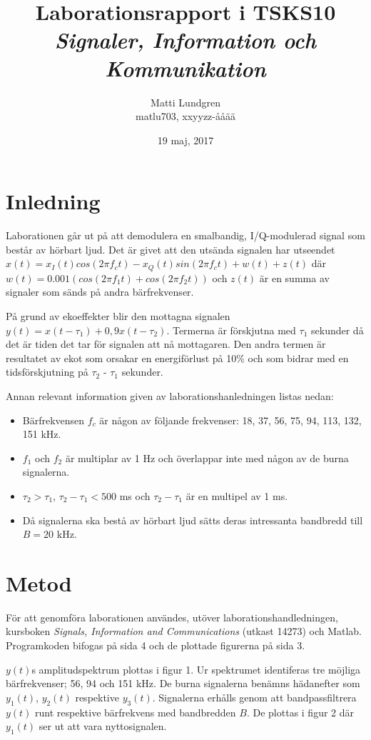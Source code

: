 \documentclass[10pt,twocolumn]{article}
\title{Laborationsrapport i TSKS10 \emph{Signaler, Information och Kommunikation}}
\author{Matti Lundgren \\ matlu703, xxyyzz-ååää }
\date{19 maj, 2017}
\begin{document}
\maketitle

\clearpage

\section{Inledning}

Laborationen går ut på att demodulera en smalbandig, I/Q-modulerad signal som består av hörbart ljud. Det är givet att den utsända signalen har utseendet $x(t)=x_I(t)cos(2\pi f_ct)-x_Q(t)sin(2\pi f_ct)+w(t)+z(t)$ där $w(t) = 0.001(cos(2\pi f_1t) + cos(2\pi f_2t))$ och $z(t)$ är en summa av signaler som sänds på andra bärfrekvenser. 

På grund av ekoeffekter blir den mottagna signalen $y(t)=x(t-\tau_1)+0,9x(t-\tau_2)$. Termerna är förskjutna med $\tau_1$ sekunder då det är tiden det tar för signalen att nå mottagaren. Den andra termen är resultatet av ekot som orsakar en energiförlust på 10\% och som bidrar med en tidsförskjutning på $\tau_2$ - $\tau_1$ sekunder.

Annan relevant information given av laborationshanledningen listas nedan:
\begin{itemize}
\item Bärfrekvensen $f_c$ är någon av följande frekvenser: 18, 37, 56, 75, 94, 113, 132, 151 kHz.
\item $f_1$ och $f_2$ är multiplar av 1 Hz och överlappar inte med någon av de burna signalerna.
\item $\tau_2>\tau_1$, $\tau_2-\tau_1<500$ ms och $\tau_2-\tau_1$ är en multipel av 1 ms.
\item Då signalerna ska bestå av hörbart ljud sätts deras intressanta bandbredd till $B=20$ kHz.
\end{itemize}

\section{Metod}

För att genomföra laborationen användes, utöver laborationshandledningen, kursboken \textit{Signals, Information and Communications} (utkast 14273) och Matlab. Programkoden bifogas på sida 4 och de plottade figurerna på sida 3.

$y(t)$s amplitudspektrum plottas i figur 1. Ur spektrumet identiferas tre möjliga bärfrekvenser; 56, 94 och 151 kHz. De burna signalerna benämns hädanefter som $y_1(t)$, $y_2(t)$ respektive $y_3(t)$. Signalerna erhålls genom att bandpassfiltrera $y(t)$ runt respektive bärfrekvens med bandbredden $B$. De plottas i figur 2 där $y_1(t)$ ser ut att vara nyttosignalen.
\end{document}
